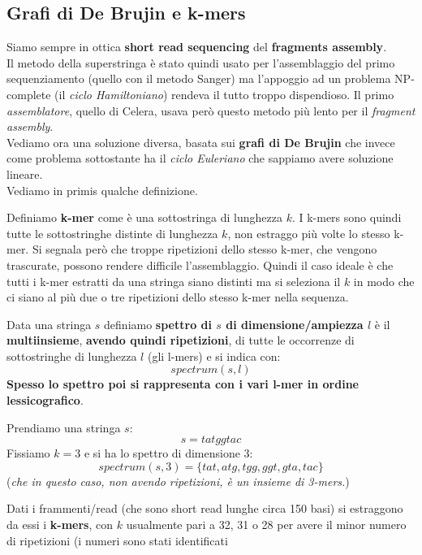 \documentclass[a4paper,12pt, oneside]{book}
\begin{document}
\subsection{Grafi di De Brujin e k-mers}
Siamo sempre in ottica \textbf{short read sequencing} del \textbf{fragments
  assembly}.\\ 
Il metodo della superstringa è stato quindi usato per l'assemblaggio del primo
sequenziamento (quello con il metodo Sanger) ma l'appoggio ad un problema
NP-complete (il \textit{ciclo Hamiltoniano}) rendeva il tutto troppo
dispendioso. Il primo \textit{assemblatore}, quello di Celera, usava però questo
metodo più lento per il \textit{fragment assembly}.\\
Vediamo ora una soluzione diversa, basata sui \textbf{grafi di De Brujin} che
invece come problema sottostante ha il \textit{ciclo Euleriano} che sappiamo
avere soluzione lineare. \\
Vediamo in primis qualche definizione.
\begin{definizione}
  Definiamo \textbf{k-mer} come è una sottostringa di lunghezza
  $k$. I k-mers sono quindi tutte le sottostringhe distinte di lunghezza $k$,
  non estraggo più volte lo stesso k-mer. Si segnala però che troppe
  ripetizioni dello stesso k-mer, che vengono trascurate, possono rendere
  difficile l'assemblaggio. Quindi il caso ideale è che tutti i k-mer estratti
  da una stringa siano distinti ma si seleziona il $k$ in modo che ci siano al
  più due o tre ripetizioni dello stesso k-mer nella sequenza.
\end{definizione}
\begin{definizione}
  Data una stringa $s$ definiamo \textbf{spettro di $s$ di dimensione/ampiezza
    $l$} è il 
  \textbf{multiinsieme}, \textbf{avendo quindi ripetizioni}, di tutte le
  occorrenze di sottostringhe di lunghezza $l$ (gli l-mers) e si indica con:
  \[spectrum(s,l)\]
  \textbf{Spesso lo spettro poi si rappresenta con i vari l-mer in ordine
    lessicografico}. 
\end{definizione}
\begin{esempio}
  Prendiamo una stringa $s$:
  \[s=tatggtac\]
  Fissiamo $k=3$ e si ha lo spettro di dimensione $3$:
  \[spectrum(s,3)=\{tat, atg, tgg, ggt, gta, tac\}\]
  (\textit{che in questo caso, non avendo ripetizioni, è un insieme di 3-mers.})
\end{esempio}
Dati i frammenti/read (che sono short read lunghe circa 150 basi) si estraggono
da essi i \textbf{k-mers}, con $k$ usualmente pari a 32, 31 o 28 per avere il
minor numero di ripetizioni (i numeri sono stati identificati
\end{document}
